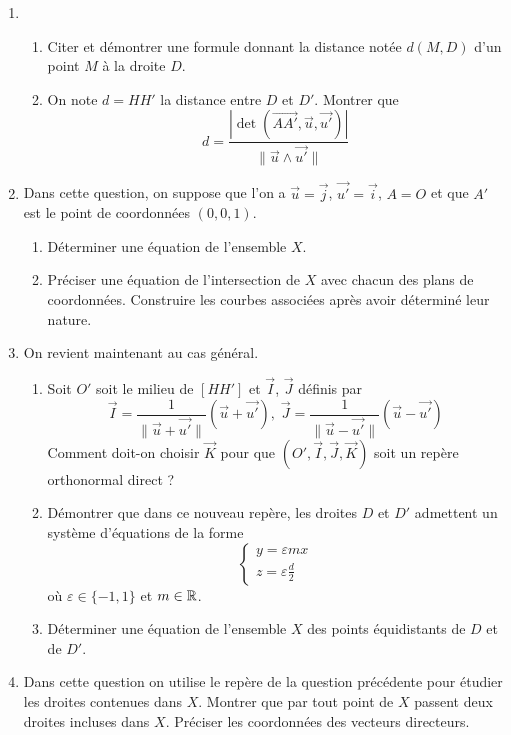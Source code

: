 \begin{enumerate}
\item \begin{enumerate}
\item Citer et démontrer une formule donnant la distance notée $d(M,D)$ d'un point $M$ à la droite $D$.
\item On note $d=HH'$ la distance entre $D$ et $D'$. Montrer que 
\[ d=\frac{|\det(\overrightarrow{AA'},\overrightarrow{u},\overrightarrow{u'})|}{\|\overrightarrow{u}\wedge \overrightarrow{u'}\|}\]
\end{enumerate}
\item Dans cette question, on suppose que l'on a $\overrightarrow{u}=\overrightarrow{j}$, $\overrightarrow{u'}=\overrightarrow{i}$, $A=O$ et que $A'$
est le point de coordonnées $(0,0,1)$.
	\begin{enumerate}
	\item Déterminer une équation de l'ensemble $X$.
	\item Préciser une équation de l'intersection de $X$ avec chacun des plans de coordonnées. Construire les courbes associées après avoir déterminé leur nature.
	\end{enumerate}
\item On revient maintenant au cas général.
	\begin{enumerate}
	\item Soit $O'$ soit le milieu de $[HH']$ et $\overrightarrow{I}$, $\overrightarrow{J}$ définis par 
\[\overrightarrow{I}=\frac{1}{\|\overrightarrow{u}+\overrightarrow{u'}\|}(\overrightarrow{u}+\overrightarrow{u'}) , \; 
\overrightarrow{J}=\frac{1}{\|\overrightarrow{u}-\overrightarrow{u'}\|}(\overrightarrow{u}-\overrightarrow{u'})\]
Comment doit-on choisir $\overrightarrow{K}$ pour que $(O',\overrightarrow{I},\overrightarrow{J},\overrightarrow{K})$ soit un repère orthonormal direct ? 
\item Démontrer que dans ce nouveau repère, les droites $D$ et $D'$ admettent un système d'équations de la forme
\begin{displaymath}
 \left \{
	\begin{aligned}
	y=\varepsilon mx\\
	z=\varepsilon \frac{d}{2}
	\end{aligned}
	\right.
\end{displaymath}
où $\varepsilon \in \{-1,1\}$ et $m \in \mathbb{R}$.
\item Déterminer une équation de l'ensemble $X$ des points équidistants de $D$ et de $D'$.
\end{enumerate}
\item Dans cette question on utilise le repère de la question précédente pour étudier les droites contenues dans $X$.\newline
Montrer que par tout point de $X$ passent deux droites incluses dans $X$. Préciser les coordonnées des vecteurs directeurs.


\end{enumerate}

